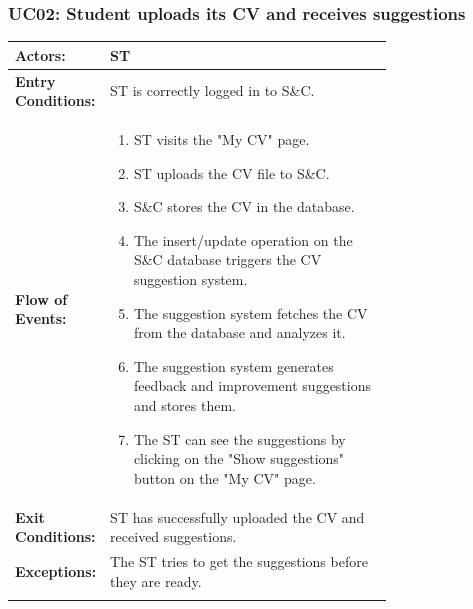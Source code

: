 \subsubsection{UC02: Student uploads its CV and receives suggestions}
\label{subsubsec:studend-upload-CV}
\begin{center}
    \begin{longtable}{|l|p{0.75\linewidth}|}
        \hline
        \textbf{Actors:}           & ST                                                                                                    \\
        \hline
        \textbf{Entry Conditions:} & ST is correctly logged in to S\&C.                                                                    \\
        \hline
        \textbf{Flow of Events:}   & \begin{enumerate}
                                         \item ST visits the "My CV" page.
                                         \item ST uploads the CV file to S\&C.
                                         \item S\&C stores the CV in the database.
                                         \item The insert/update operation on the S\&C database triggers the CV suggestion system.
                                         \item The suggestion system fetches the CV from the database and analyzes it.
                                         \item The suggestion system generates feedback and improvement suggestions and stores them.
                                         \item The ST can see the suggestions by clicking on the "Show suggestions" button on the "My CV" page.
                                     \end{enumerate} \\
        \hline
        \textbf{Exit Conditions:}  & ST has successfully uploaded the CV and received suggestions.                                         \\
        \hline
        \textbf{Exceptions:}       & The ST tries to get the suggestions before they are ready.                                            \\                                                      \\
        \hline
    \end{longtable}
\end{center}

